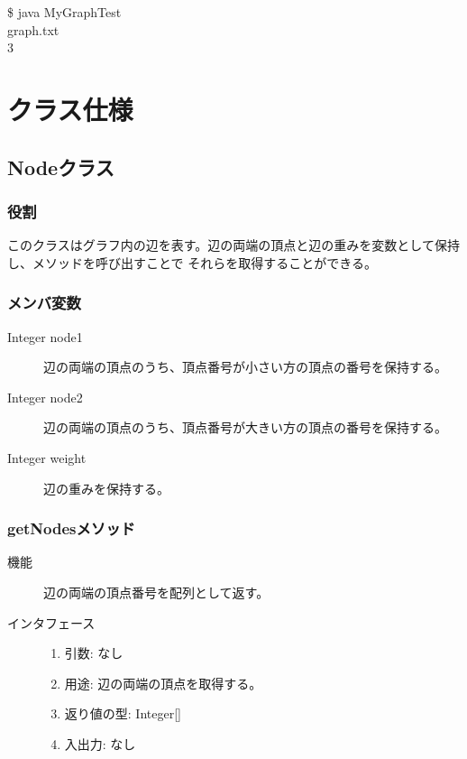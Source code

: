 \documentclass[a4j]{jarticle}
\begin{document}
\begin{screen}
\$ java MyGraphTest \\
graph.txt  \\
3
\end{screen}

\section{クラス仕様}

\subsection{Nodeクラス}

\subsubsection{役割}
このクラスはグラフ内の辺を表す。辺の両端の頂点と辺の重みを変数として保持し、メソッドを呼び出すことで
それらを取得することができる。

\subsubsection{メンバ変数}

\begin{description}
\item[Integer node1]
辺の両端の頂点のうち、頂点番号が小さい方の頂点の番号を保持する。

\item[Integer node2]
辺の両端の頂点のうち、頂点番号が大きい方の頂点の番号を保持する。

\item[Integer weight]
辺の重みを保持する。

\end{description}

\subsubsection{getNodesメソッド}

\begin{description}
\item[機能]
辺の両端の頂点番号を配列として返す。

\item[インタフェース]
\begin{enumerate}
  \item 引数: なし
  \item 用途: 辺の両端の頂点を取得する。
  \item 返り値の型: Integer[]
  \item 入出力: なし
\end{enumerate}
\end{description}
\end{document}
